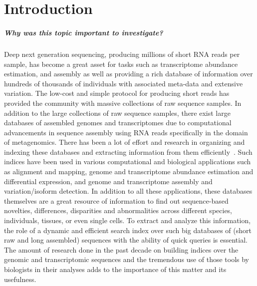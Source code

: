 \usepackage{natbib}

\chapter{Introduction}

\paragraph*{Why was this topic important to investigate?}

Deep next generation sequencing, producing millions of short RNA reads per sample,
has become a great asset for tasks such as transcriptome abundance estimation, and
assembly as well as providing a rich database of information over hundreds of thousands of individuals
with associated meta-data and extensive variation. The low-cost and simple protocol for
producing short reads has provided the community with massive collections of raw sequence samples.
In addition to the large collections of raw sequence samples,
there exist large databases of assembled genomes and transcriptomes
due to computational advancements in sequence assembly
using RNA reads specifically in the domain of metagenomics.
There has been a lot of effort and research in organizing and indexing these databases
and extracting information from them efficiently~\cite{paten2017genome}.
Such indices have been used in various computational
and biological applications such as alignment and mapping,
genome and transcriptome abundance estimation and differential expression,
and genome and transcriptome assembly and variation/isoform detection.
In addition to all these applications, these databases themselves are a great resource
of information to find out sequence-based novelties, differences, disparities and abnormalities
across different species, individuals, tissues, or even single cells.
To extract and analyze this information, the role of a dynamic and efficient search index
over such big databases of (short raw and long assembled) sequences
with the ability of quick queries is essential.
The amount of research done in the past decade on building indices over
the genomic and transcriptomic sequences and the tremendous use of those tools by biologists
in their analyses adds to the importance of this matter and its usefulness.


